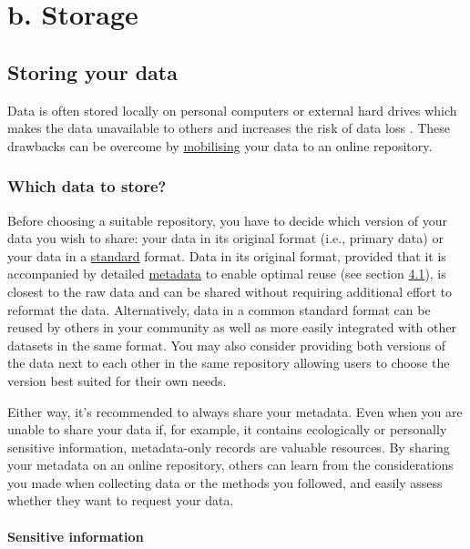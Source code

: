 \documentclass[
  oneside]{book}
\begin{document}
\part*{b. Storage}\label{part-b.-storage}

\chapter{Storing your data}\label{storing-your-data}

Data is often stored locally on personal computers or external hard drives which makes the data unavailable to others and increases the risk of data loss \autocite{Tenopir_2020}. These drawbacks can be overcome by \hyperref[mobilisation]{mobilising} your data to an online repository.

\section{Which data to store?}\label{which-data-to-store}

Before choosing a suitable repository, you have to decide which version of your data you wish to share: your data in its original format (i.e., primary data) or your data in a \hyperref[standardise]{standard} format. Data in its original format, provided that it is accompanied by detailed \hyperref[metadata]{metadata} to enable optimal reuse (see section \hyperref[describe-data]{4.1}), is closest to the raw data and can be shared without requiring additional effort to reformat the data. Alternatively, data in a common standard format can be reused by others in your community as well as more easily integrated with other datasets in the same format. You may also consider providing both versions of the data next to each other in the same repository allowing users to choose the version best suited for their own needs.

Either way, it's recommended to always share your metadata. Even when you are unable to share your data if, for example, it contains ecologically or personally sensitive information, metadata-only records are valuable resources. By sharing your metadata on an online repository, others can learn from the considerations you made when collecting data or the methods you followed, and easily assess whether they want to request your data.

\subsection{Sensitive information}\label{sensitive-information}
\end{document}
